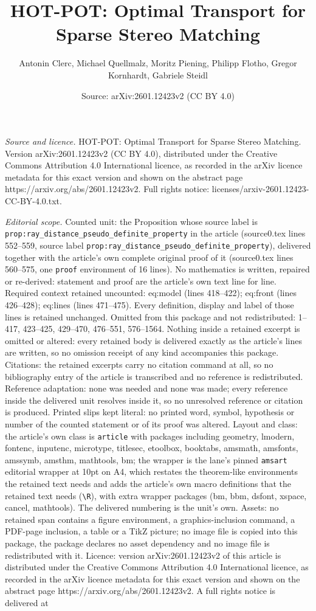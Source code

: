 \documentclass[10pt,a4paper]{amsart}
\title[HOT-POT: Optimal Transport for Sparse Stereo Matching]{HOT-POT: Optimal Transport for Sparse Stereo Matching}
\author{Antonin Clerc, Michael Quellmalz, Moritz Piening, Philipp Flotho, Gregor Kornhardt, Gabriele Steidl}
\date{Source: arXiv:2601.12423v2 (CC BY 4.0)}
\begin{document}
\maketitle

\noindent\emph{Source and licence.} HOT-POT: Optimal Transport for Sparse Stereo Matching. Version arXiv:2601.12423v2 (CC BY 4.0), distributed under the Creative Commons Attribution 4.0 International licence, as recorded in the arXiv licence metadata for this exact version and shown on the abstract page https://arxiv.org/abs/2601.12423v2. Full rights notice: licenses/arxiv-2601.12423-CC-BY-4.0.txt.\par\smallskip

\noindent\textit{Editorial scope.} Counted unit: the Proposition whose source label is \texttt{prop:ray\_distance\_pseudo\_definite\_property} in the article (source0.tex lines 552--559, source label \texttt{prop:ray\_distance\_pseudo\_definite\_property}), delivered together with the article's own complete original proof of it (source0.tex lines 560--575, one \texttt{proof} environment of 16 lines). No mathematics is written, repaired or re-derived: statement and proof are the article's own text line for line. Required context retained uncounted: eq:model (lines 418--422); eq:front (lines 426--428); eq:lines (lines 471--475). Every definition, display and label of those lines is retained unchanged. Omitted from this package and not redistributed: 1--417, 423--425, 429--470, 476--551, 576--1564. Nothing inside a retained excerpt is omitted or altered: every retained body is delivered exactly as the article's lines are written, so no omission receipt of any kind accompanies this package. Citations: the retained excerpts carry no citation command at all, so no bibliography entry of the article is transcribed and no reference is redistributed. Reference adaptation: none was needed and none was made; every reference inside the delivered unit resolves inside it, so no unresolved reference or citation is produced. Printed slips kept literal: no printed word, symbol, hypothesis or number of the counted statement or of its proof was altered. Layout and class: the article's own class is \texttt{article} with packages including geometry, lmodern, fontenc, inputenc, microtype, titlesec, etoolbox, booktabs, amsmath, amsfonts, amssymb, amsthm, mathtools, bm; the wrapper is the lane's pinned \texttt{amsart} editorial wrapper at 10pt on A4, which restates the theorem-like environments the retained text needs and adds the article's own macro definitions that the retained text needs (\texttt{\textbackslash R}), with extra wrapper packages (bm, bbm, dsfont, xspace, cancel, mathtools). The delivered numbering is the unit's own. Assets: no retained span contains a figure environment, a graphics-inclusion command, a PDF-page inclusion, a table or a TikZ picture; no image file is copied into this package, the package declares no asset dependency and no image file is redistributed with it. Licence: version arXiv:2601.12423v2 of this article is distributed under the Creative Commons Attribution 4.0 International licence, as recorded in the arXiv licence metadata for this exact version and shown on the abstract page https://arxiv.org/abs/2601.12423v2. A full rights notice is delivered at 
\end{document}

